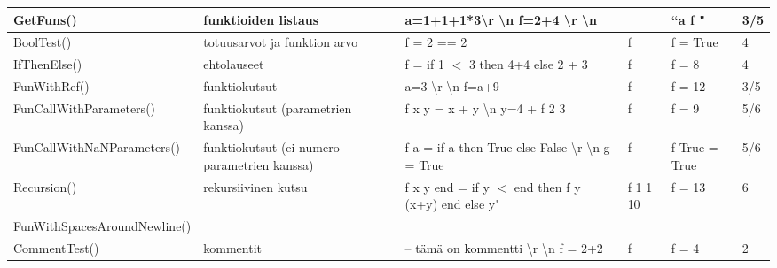 \documentclass[11pt]{article} %
\begin{document}
\begin{table}[!htbp]
\begin{tabular}{|p{3cm}|p{}|p{3cm}|p{}|p{3cm}|p{}|}
 GetFuns()             & funktioiden listaus   & a=1+1+1*3\textbackslash r \textbackslash n f=2+4 \textbackslash r \textbackslash n &  &  ``a f "         &   3/5          \\ \hline
 BoolTest()    & totuusarvot ja funktion arvo  & f = 2 == 2   & f & f = True         & 4    \\ \hline
 IfThenElse()    & ehtolauseet                & f = if 1 $<$ 3 then 4+4 else 2 + 3   & f & f = 8         & 4    \\ \hline
 FunWithRef()  & funktiokutsut      &   a=3 \textbackslash r \textbackslash n f=a+9          &  f         & f = 12   & 3/5                                        \\ \hline
 FunCallWith\-Parameters()   &  funktiokutsut (parametrien kanssa)  &  f x y = x + y \textbackslash n   y=4 + f 2 3 &      f & f = 9        &  5/6             \\ \hline
 FunCallWith\-NaNPara\-meters()   &  funktiokutsut (ei-numero-parametrien kanssa)  &  f a = if a then True else False \textbackslash r \textbackslash n g = True &      f & f True = True        &  5/6             \\ \hline
 Recursion()   & rekursiivinen kutsu      &  f x y end = if y $<$ end then f y (x+y) end else y"    & f 1 1 10  & f = 13         
& 6         \\ \hline
FunWithSpaces\-AroundNewline()       &                      &                       &       &     &                                                   \\ \hline             
CommentTest()       &  kommentit       &   -- tämä on kommentti \textbackslash r \textbackslash n f = 2+2                    &  f     & f = 4    &   2              \\ \hline             
\end{tabular}
\end{table}
\end{document}
